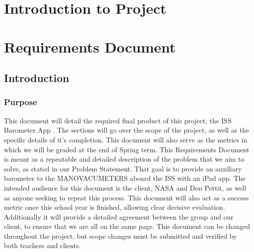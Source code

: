 \documentclass[onecolumn, draftclsnofoot,10pt, compsoc]{IEEEtran}
\def \CapstoneProjectName{ISS Barometer App }
\begin{document}

\section{Introduction to Project}

\section{Requirements Document}

\subsection{Introduction}

\subsubsection{Purpose}
This document will detail the required final product of this project, the \CapstoneProjectName.
The sections will go over the scope of the project, as well as the specific details of it's completion.
This document will also serve as the metrics in which we will be graded at the end of Spring term.
This Requirements Document is meant as a repeatable and detailed description of the problem that we aim to solve, as stated in our Problem Statement.
That goal is to provide an auxiliary barometer to the MANOVACUMETERS aboard the ISS with an iPad app.
The intended audience for this document is the client, NASA and Don Pettit, as well as anyone seeking to repeat this process.
This document will also act as a success metric once this school year is finished, allowing clear decisive evaluation.
Additionally it will provide a detailed agreement between the group and our client, to ensure that we are all on the same page.
This document can be changed throughout the project, but scope changes must be submitted and verified by both teachers and clients.
\end{document}
